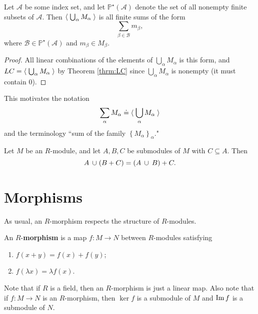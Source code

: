 \documentclass[twoside,10pt]{report}
\begin{document}
\begin{prop}
	Let $\mathcal{A}$ be some index set, and let $\mathbb{P}^{\star}(\mathcal{A})$ denote the set of all nonempty finite subsets of $\mathcal{A}$. Then $\left\langle \;\bigcup_{\alpha}M_{\alpha}\; \right\rangle$ is all finite sums of the form
	\[
	\sum_{\beta \in \mathcal{B}} m_{\beta},
	\] where $\mathcal{B} \in \mathbb{P}^{\star}(\mathcal{A})$ and $m_{\beta} \in M_{\beta}$.
\end{prop}
\begin{proof}
	All linear combinations of the elements of $\bigcup_{\alpha}M_{\alpha}$ is this form, and $LC = \left\langle \;\bigcup_{\alpha}M_{\alpha}\; \right\rangle$ by Theorem \ref{thrm:LC} since $\bigcup_{\alpha}M_{\alpha}$ is nonempty (it must contain 0).
\end{proof}
This motivates the notation
\[
\sum_{\alpha}M_{\alpha} \doteq \langle \; \bigcup_{\alpha}M_{\alpha}\; \rangle
\] 
and the terminology ``sum of the family $\left\{ M_{\alpha} \right\}_{\alpha}$."

\begin{thrm}
Let $M$ be an $R$-module, and let $A,B,C$ be submodules of $M$ with $C \subseteq A$. Then
\[
	A \operatorname{\;\cup\;} (B+C) = (A\operatorname{\;\cup\;} B) + C.
\] 
\end{thrm}

\section{Morphisms}

As usual, an $R$-morphism respects the structure of $R$-modules.
\begin{defn}[]
An $R$-\textbf{morphism} is a map $f:M\to N$ between $R$-modules satisfying
\begin{enumerate}
	\item $f(x+y) = f(x) + f(y)$;
	\item $f(\lambda x) = \lambda f(x)$.
\end{enumerate}
\end{defn}

Note that if $R$ is a field, then an $R$-morphism is just a linear map. Also note that if $f:M\to N$ is an $R$-morphism, then $\ker f$ is a submodule of $M$ and $\operatorname{Im} f$ is a submodule of $N$.
\end{document}
